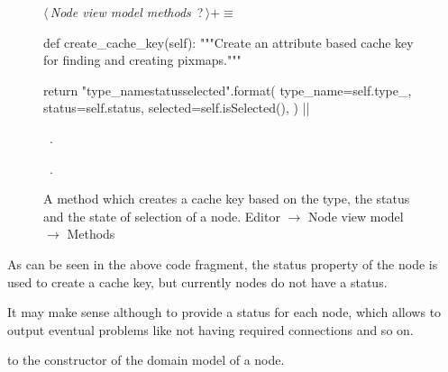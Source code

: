 \documentclass[%
    a4paper,    %
    justified,  %
    nobib,      %
    openany     %
]{tufte-book}
\makeatletter
\renewcommand{\label}[1]{\@tufte@label{##1}}%
\makeatother
\begin{document}
\begin{figure}
\begin{flushleft} \small
\begin{minipage}{\linewidth}\label{scrap75}\raggedright\small
{} $\langle\,${\itshape Node view model methods}\nobreak\ {\footnotesize {?}}$\,\rangle+\equiv$
\vspace{-1ex}
\begin{pythoncode}
def create_cache_key(self):
    """Create an attribute based cache key for finding and creating
    pixmaps."""

    return "{type_name}{status}{selected}".format(
        type_name=self.type_,
        status=self.status,
        selected=self.isSelected(),
    )
|\NWsep|
\end{pythoncode}
\vspace{1.5ex}
\footnotesize
\begin{list}{}{\setlength{\itemsep}{-\parsep}\setlength{\itemindent}{-\leftmargin}}
\item \NWtxtMacroDefBy\ .
\item \NWtxtMacroRefIn\ .

\item{}
\end{list}
\end{minipage}\vspace{4ex}
\end{flushleft}
\caption{A method which creates a cache key based on the type, the status and
  the state of selection of a node.
  \newline{}\newline{}Editor $\rightarrow$ Node view model $\rightarrow$
  Methods}
\label{editor:lst:node-view-model:methods:create-cache-key}
\end{figure}

As can be seen in the above code fragment, the status property of the node is
used to create a cache key, but currently nodes do not have a status.

It may make sense although to provide a status for each node, which allows to
output eventual problems like not having required connections and so on.

 to the constructor of the domain model of a node.
\end{document}
